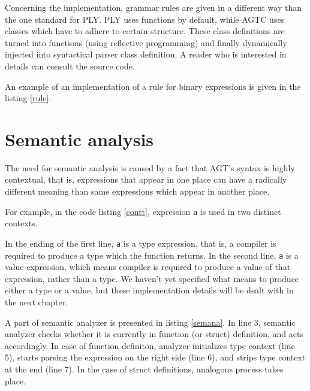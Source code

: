 \documentclass[times, utf8, diplomski]{fer}
\theoremstyle{definition}
\newcommand{\textcode}[3]{
    
}
\begin{document}
\textcode{\resdir/compiler/ast}{ast}{AST resulting from \texttt{let n = in<i32>();}}

Concerning the implementation, grammar rules are given in a different way than the
one standard for PLY. PLY uses functions by default, while AGTC uses
classes which have to adhere to certain structure. These class definitions
are turned into functions (using reflective programming) and finally
dynamically injected into syntactical parser class definition.
A reader who is interested in details can consult the source code.

An example of an implementation of a rule for binary expressions is given in the listing \ref{rule}.
\\

\textcode{\resdir/compiler/rule.py}{rule}{Binary expression rule implementation}

\section{Semantic analysis}

The need for semantic analysis is caused by a fact that AGT's syntax is highly contextual,
that is, expressions that appear in one place can have a radically different meaning
than same expressions which appear in another place.

For example, in the code listing \ref{contt}, expression \texttt{a} is used in two distinct contexts.

\textcode{\resdir/compiler/contextual.agt}{contt}{Contextuality of expression \texttt{a}}

In the ending of the first line, \texttt{a} is a type expression, that is, a
compiler is required to produce a type which the function returns. In the
second line, \texttt{a} is a value expression,
which means compiler is required to produce a value of that expression, rather than a type.
We haven't yet specified what means to produce either a type or a value, but these implementation
details will be dealt with in the next chapter.

A part of semantic analyzer is presented in listing \ref{semana}.
In line 3, semantic analyzer checks whether it is currently in function (or struct) definition, 
and acts accordingly. In case of function definiton, analyzer initializes type context (line 5),
starts parsing the expression on the right side (line 6), 
and strips type context at the end (line 7).
In the case of struct definitions, analogous process takes place.
\end{document}
